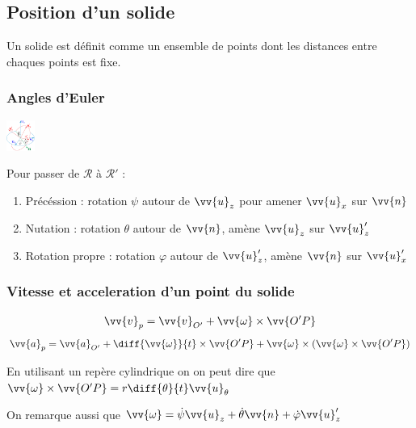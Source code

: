 \documentclass[landscape,a4paper]{article}
\newcommand{\vi}{\ensuremath{\vv{v}}}
\newcommand{\vian}{\ensuremath{\vv{\omega}}}
\newcommand{\ac}{\ensuremath{\vv{a}}}
\newcommand{\ux}{\ensuremath{\vv{u}_x}}
\newcommand{\uz}{\ensuremath{\vv{u}_z}}
\newcommand{\utheta}{\ensuremath{\vv{u}_{\theta}}}
\newcommand{\refe}{\mathcal{R}}
\newcommand{\nod}{\vv{n}}
\begin{document}
\begin{multicols}{4}
  \subsection{Position d'un solide}
  Un solide est définit comme un ensemble de points dont les distances entre chaques points est fixe. 

  \subsubsection{Angles d'Euler}
  \begin{center}
    \includegraphics[width=0.07\textwidth]{images/euler.PNG}
  \end{center}
  
  Pour passer de \(\refe\) à \(\refe'\) : 
  \begin{enumerate}
    \item Précéssion : rotation \(\psi\) autour de \(\uz\) pour amener \(\ux\) sur \(\nod\)
    \item Nutation : rotation \(\theta\) autour de \(\nod\), amène \(\uz\) sur \(\uz'\) 
    \item Rotation propre : rotation \(\varphi\) autour de \(\uz'\), amène \(\nod\) sur \(\ux'\) 
  \end{enumerate}

  \subsubsection{Vitesse et acceleration d'un point du solide}
  \[\vi_p=\vi_{O'}+\vian\times\vv{O'P}\]
  \[\ac_p=\ac_{O'}+\diff{\vian}{t}\times\vv{O'P}+\vian\times(\vian\times\vv{O'P})\]

  En utilisant un repère cylindrique on on peut dire que \(\vian\times\vv{O'P}=r\diff{\theta}{t}\utheta\) 

  On remarque aussi que \(\vian = \dot{\psi}\uz + \dot{\theta}\nod + \dot{\varphi}\uz'\)


\end{multicols}
\end{document}
